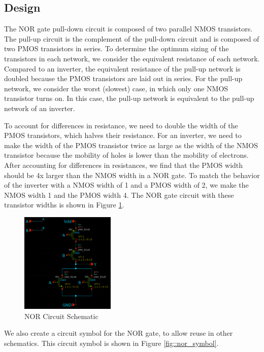 \documentclass[fleqn]{article}
\begin{document}
	\subsection{Design}
	
	The NOR gate pull-down circuit is composed of two parallel NMOS transistors. The pull-up circuit is the complement of the pull-down circuit and is composed of two PMOS transistors in series. To determine the optimum sizing of the transistors in each network, we consider the equivalent resistance of each network. Compared to an inverter, the equivalent resistance of the pull-up network is doubled because the PMOS transistors are laid out in series. For the pull-up network, we consider the worst (slowest) case, in which only one NMOS transistor turns on. In this case, the pull-up network is equivalent to the pull-up network of an inverter.
	
	To account for differences in resistance, we need to double the width of the PMOS transistors, which halves their resistance. For an inverter, we need to make the width of the PMOS transistor twice as large as the width of the NMOS transistor because the mobility of holes is lower than the mobility of electrons. After accounting for differences in resistances, we find that the PMOS width should be 4x larger than the NMOS width in a NOR gate. To match the behavior of the inverter with a NMOS width of 1 and a PMOS width of 2, we make the NMOS width 1 and the PMOS width 4. The NOR gate circuit with these transistor widths is shown in Figure \ref{fig::nor_schematic}.
	
	\begin{figure}[H]
		\centerline{\includegraphics[width=0.4\textwidth]{nor_schematic.png}}
		\caption{NOR Circuit Schematic}
		\label{fig::nor_schematic}
	\end{figure}
	
	\noindent We also create a circuit symbol for the NOR gate, to allow reuse in other schematics. This circuit symbol is shown in Figure \ref{fig::nor_symbol}.
	
\end{document}
